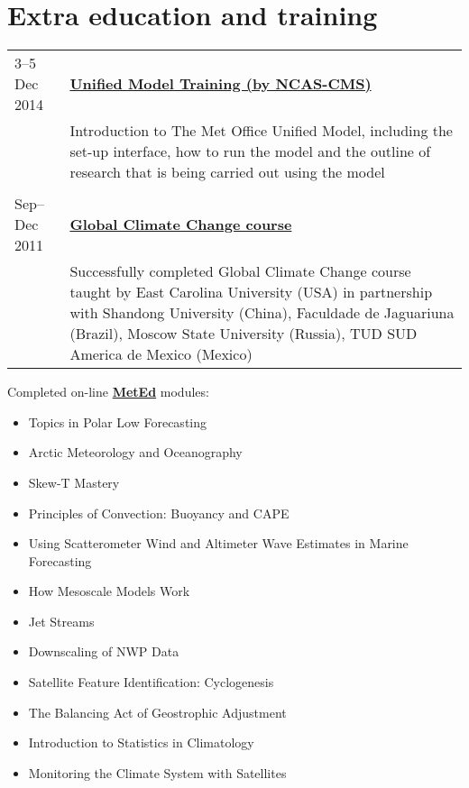 \documentclass[a4paper,11pt]{article}
\newlength{\mycol}
\begin{document}
\section{Extra education and training}
\begin{tabu} to 
{\small 3--5 Dec} 2014 & \textbf{\href{http://cms.ncas.ac.uk/wiki/UmTraining}{Unified Model Training (by NCAS-CMS)}} \\
& Introduction to The Met Office Unified Model, including the set-up interface, how to run the model and the outline of research that is being carried out using the model\\
\\

{\small Sep--Dec} 2011 & \textbf{\href{http://gcc.aos.ecu.edu/}{Global Climate Change course}} \\
& Successfully completed Global Climate Change course taught by East Carolina University (USA) in partnership with Shandong University (China), Faculdade de Jaguariuna (Brazil), Moscow State University (Russia), TUD SUD America de Mexico (Mexico)
\end{tabu}

\vspace{.1in}
Completed on-line \textbf{\href{https://www.meted.ucar.edu/}{MetEd}} modules:

\begin{small}
\begin{itemize}
        \item Topics in Polar Low Forecasting
        \item Arctic Meteorology and Oceanography
        \item Skew-T Mastery
        \item Principles of Convection: Buoyancy and CAPE
        \item Using Scatterometer Wind and Altimeter Wave Estimates in Marine Forecasting
        \item How Mesoscale Models Work
        \item Jet Streams
        \item Downscaling of NWP Data
        \item Satellite Feature Identification: Cyclogenesis
        \item The Balancing Act of Geostrophic Adjustment
        \item Introduction to Statistics in Climatology
        \item Monitoring the Climate System with Satellites
\end{itemize}
\end{small}
\end{document}
